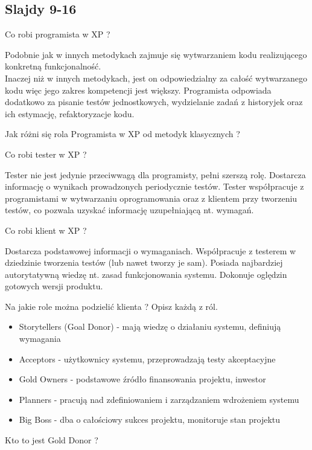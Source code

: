\documentclass[a4paper,15pt]{article}
\newcommand{\question}[2]{
    \begin{tcolorbox}[colback=mRed!5!white,colframe=mRed,title={Kolokwium 2018 #1}]
        #2
    \end{tcolorbox}
}
\begin{document}
\subsection{Slajdy 9-16}
\begin{framed}
Co robi programista w XP ?
\end{framed}
Podobnie jak w innych metodykach zajmuje się wytwarzaniem kodu realizującego konkretną funkcjonalność. \\ Inaczej niż w innych metodykach, jest on odpowiedzialny za całość wytwarzanego kodu więc jego zakres kompetencji jest większy. Programista odpowiada dodatkowo za pisanie testów jednostkowych, wydzielanie zadań z historyjek oraz ich estymację, refaktoryzacje kodu.
\question{}{
Jak różni się rola Programista w XP od metodyk klasycznych ?
}

\begin{framed}
Co robi tester w XP ?
\end{framed}
Tester nie jest jedynie przeciwwagą dla programisty, pełni szerszą rolę. Dostarcza informację o wynikach prowadzonych periodycznie testów. Tester współpracuje z programistami w wytwarzaniu oprogramowania oraz z klientem przy tworzeniu testów, co pozwala uzyskać informację uzupełniającą nt. wymagań.

\begin{framed}
Co robi klient w XP ?
\end{framed}
Dostarcza podstawowej informacji o wymaganiach. Współpracuje z testerem w dziedzinie tworzenia testów (lub nawet tworzy je sam). Posiada najbardziej autorytatywną wiedzę nt. zasad funkcjonowania systemu. Dokonuje oględzin gotowych wersji produktu.

\begin{framed}
Na jakie role można podzielić klienta ? Opisz każdą z ról.
\end{framed}
\begin{itemize}
\item Storytellers (Goal Donor) - mają wiedzę o działaniu systemu, definiują wymagania 
\item Acceptors - użytkownicy systemu, przeprowadzają testy akceptacyjne
\item Gold Owners - podstawowe źródło finansowania projektu, inwestor
\item Planners - pracują nad zdefiniowaniem i zarządzaniem wdrożeniem systemu
\item Big Boss - dba o całościowy sukces projektu, monitoruje stan projektu
\end{itemize}
\question{}{Kto to jest Gold Donor ?}
\end{document}
